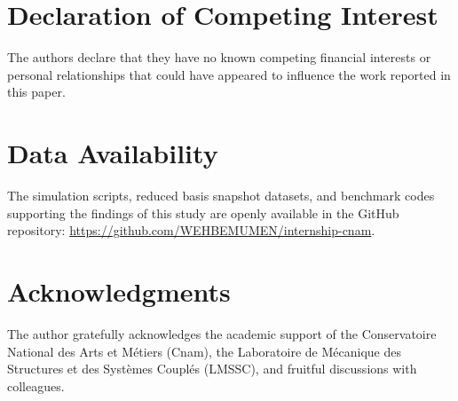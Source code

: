 \documentclass[final,5p,times,twocolumn]{elsarticle}
\begin{document}
\section*{Declaration of Competing Interest}
The authors declare that they have no known competing financial interests or personal relationships that could have appeared to influence the work reported in this paper.

\section*{Data Availability}
The simulation scripts, reduced basis snapshot datasets, and benchmark codes supporting the findings of this study are openly available in the GitHub repository: \url{https://github.com/WEHBEMUMEN/internship-cnam}.

\section*{Acknowledgments}
The author gratefully acknowledges the academic support of the Conservatoire National des Arts et Métiers (Cnam), the Laboratoire de Mécanique des Structures et des Systèmes Couplés (LMSSC), and fruitful discussions with colleagues.



\end{document}
